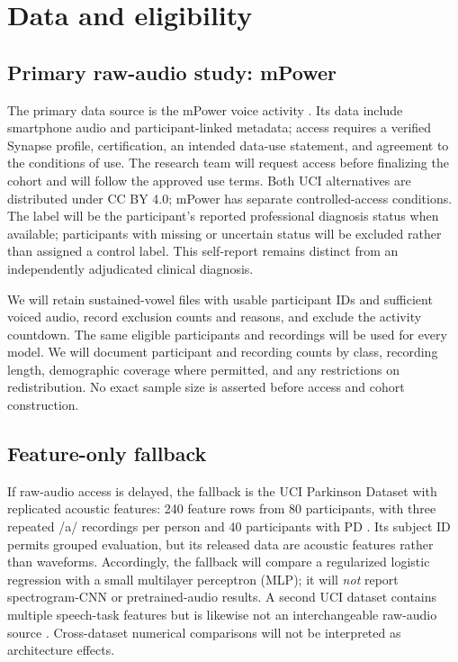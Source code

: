 \documentclass{article}
\begin{document}
\section{Data and eligibility}
\subsection{Primary raw-audio study: mPower}
The primary data source is the mPower voice activity \citep{bot2016}. Its data include smartphone audio and participant-linked metadata; access requires a verified Synapse profile, certification, an intended data-use statement, and agreement to the conditions of use. The research team will request access before finalizing the cohort and will follow the approved use terms. Both UCI alternatives are distributed under CC BY 4.0; mPower has separate controlled-access conditions. The label will be the participant's reported professional diagnosis status when available; participants with missing or uncertain status will be excluded rather than assigned a control label. This self-report remains distinct from an independently adjudicated clinical diagnosis.

We will retain sustained-vowel files with usable participant IDs and sufficient voiced audio, record exclusion counts and reasons, and exclude the activity countdown. The same eligible participants and recordings will be used for every model. We will document participant and recording counts by class, recording length, demographic coverage where permitted, and any restrictions on redistribution. No exact sample size is asserted before access and cohort construction.

\subsection{Feature-only fallback}
If raw-audio access is delayed, the fallback is the UCI Parkinson Dataset with replicated acoustic features: 240 feature rows from 80 participants, with three repeated /a/ recordings per person and 40 participants with PD \citep{uci489}. Its subject ID permits grouped evaluation, but its released data are acoustic features rather than waveforms. Accordingly, the fallback will compare a regularized logistic regression with a small multilayer perceptron (MLP); it will \emph{not} report spectrogram-CNN or pretrained-audio results. A second UCI dataset contains multiple speech-task features but is likewise not an interchangeable raw-audio source \citep{sakar2013,uci301}. Cross-dataset numerical comparisons will not be interpreted as architecture effects.
\end{document}
